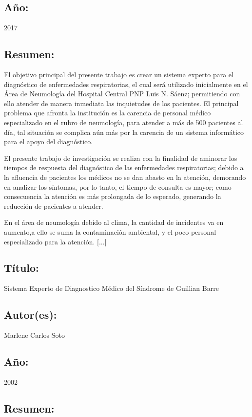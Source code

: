 \documentclass[preprint,12pt,notitlepage]{elsarticle}
\begin{document}
\subsection{Año:} 2017

\subsection{Resumen:}

El objetivo principal del presente trabajo es crear un sistema experto para el diagnóstico de enfermedades respiratorias, el cual será utilizado inicialmente en el Área de Neumología del Hospital Central PNP Luis N. Sáenz; permitiendo con ello atender de manera inmediata las inquietudes de los pacientes. El principal problema que afronta la institución es la carencia de personal médico especializado en el rubro de neumología, para atender a más de 500 pacientes al día, tal situación se complica aún más por la carencia de un sistema informático para el apoyo del diagnóstico.

El presente trabajo de investigación se realiza con la finalidad de aminorar los tiempos de respuesta del diagnóstico de las enfermedades respiratorias; debido a la afluencia de pacientes los médicos no se dan abasto en la atención, demorando en analizar los síntomas, por lo tanto, el tiempo de consulta es mayor; como consecuencia la atención es más prolongada de lo esperado, generando la reducción de pacientes a atender.

En el área de neumología debido al clima, la cantidad de incidentes va en aumento,a ello se suma la contaminación ambiental, y el poco personal especializado para la atención. [...]

\subsection{Título:} Sistema Experto de Diagnostico Médico del Síndrome de Guillian Barre

\subsection{Autor(es):} Marlene Carlos Soto

\subsection{Año:} 2002

\subsection{Resumen:}
\end{document}
